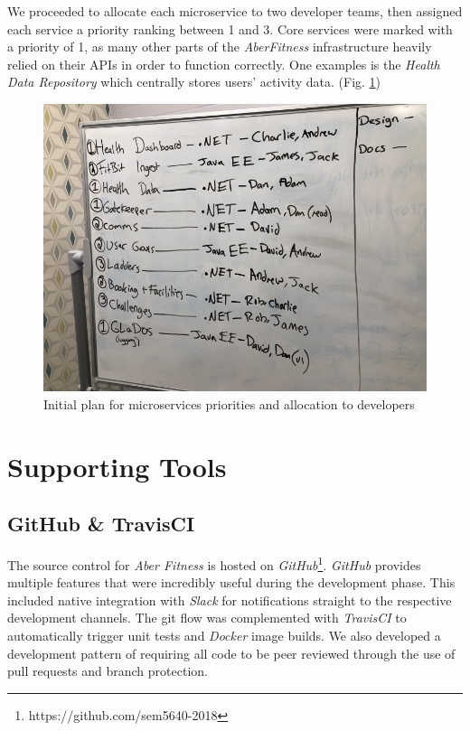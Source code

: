 \par
We proceeded to allocate each microservice to two developer teams, then assigned each service a priority ranking between 1 and 3. Core services were marked with a priority of 1, as many other parts of the \textit{AberFitness} infrastructure heavily relied on their APIs in order to function correctly. One examples is the \textit{Health Data Repository} which centrally stores users' activity data. (Fig. \ref{fig:numbering_microservice_priority})

\begin{figure}[H]
    \centering
    \includegraphics[width=\textwidth]{Images/Numbering_Microservices.jpg}
    \caption{Initial plan for microservices priorities and allocation to developers}
    \label{fig:numbering_microservice_priority}
\end{figure}


\section{Supporting Tools}
\subsection{GitHub \& TravisCI}
The source control for \textit{Aber Fitness} is hosted on \textit{GitHub}\footnote{https://github.com/sem5640-2018}. \textit{GitHub} provides multiple features that were incredibly useful during the development phase. This included native integration with \textit{Slack} for notifications straight to the respective development channels. The git flow was complemented with \textit{TravisCI} to automatically trigger unit tests and \textit{Docker} image builds. We also developed a development pattern of requiring all code to be peer reviewed through the use of pull requests and branch protection.

